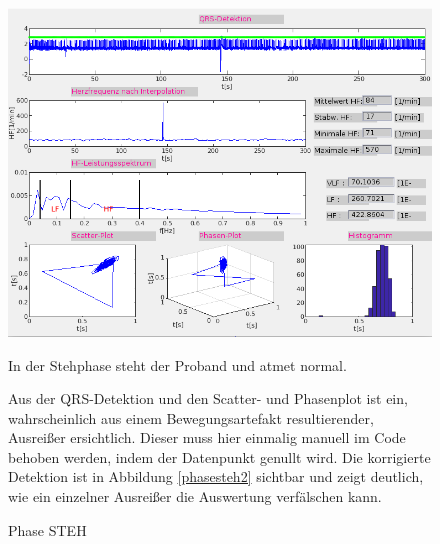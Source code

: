 \documentclass[a4paper,12pt,titlepage]{scrartcl}
\begin{document}
\begin{figure}[ht]
    \begin{minipage}[t]{0.5\linewidth}
        \centering
        \includegraphics[width=0.9\linewidth, valign=t]{Assets/LaborBMT-17-09-35.png}
        \caption{Phase STEH}
        \label{phasesteh}
    \end{minipage}%
    \begin{minipage}[t]{0.5\linewidth}
        In der Stehphase steht der Proband und atmet normal.

        Aus der QRS-Detektion und den Scatter- und Phasenplot ist ein, wahrscheinlich aus einem Bewegungsartefakt resultierender, Ausreißer ersichtlich. Dieser muss hier einmalig manuell im Code behoben werden, indem der Datenpunkt genullt wird. Die korrigierte Detektion ist in Abbildung \ref{phasesteh2} sichtbar und zeigt deutlich, wie ein einzelner Ausreißer die Auswertung verfälschen kann.

    \end{minipage}
\end{figure}
\end{document}
